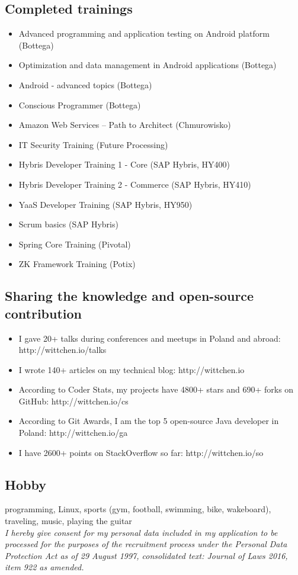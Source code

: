 \documentclass{article}
\begin{document}
    \subsection*{Completed trainings}
    \begin{itemize}
      \item Advanced programming and application testing on Android platform (Bottega)
      \item Optimization and data management in Android applications (Bottega)
      \item Android - advanced topics (Bottega)
      \item Conscious Programmer (Bottega)
      \item Amazon Web Services – Path to Architect (Chmurowisko)
      \item IT Security Training (Future Processing)
      \item Hybris Developer Training 1 - Core (SAP Hybris, HY400)
      \item Hybris Developer Training 2 - Commerce (SAP Hybris, HY410)
      \item YaaS Developer Training (SAP Hybris, HY950)
      \item Scrum basics (SAP Hybris)
      \item Spring Core Training (Pivotal)
      \item ZK Framework Training (Potix)
    \end{itemize}

    \subsection*{Sharing the knowledge and open-source contribution}
    \begin{itemize}
      \item I gave 20+ talks during conferences and meetups in Poland and abroad: http://wittchen.io/talks
      \item I wrote 140+ articles on my technical blog: http://wittchen.io
      \item According to Coder Stats, my projects have 4800+ stars and 690+ forks on GitHub: http://wittchen.io/cs
      \item According to Git Awards, I am the top 5 open-source Java developer in Poland: http://wittchen.io/ga
      \item I have 2600+ points on StackOverflow so far: http://wittchen.io/so
    \end{itemize}

    \subsection*{Hobby}
    programming, Linux, sports (gym, football, swimming, bike, wakeboard), traveling, music, playing the guitar\\

    \textit{
    I hereby give consent for my personal data included in my application
    to be processed for the purposes of the recruitment process
    under the Personal Data Protection Act as of 29 August 1997,
    consolidated text: Journal of Laws 2016, item 922 as amended.
    }
\end{document}

